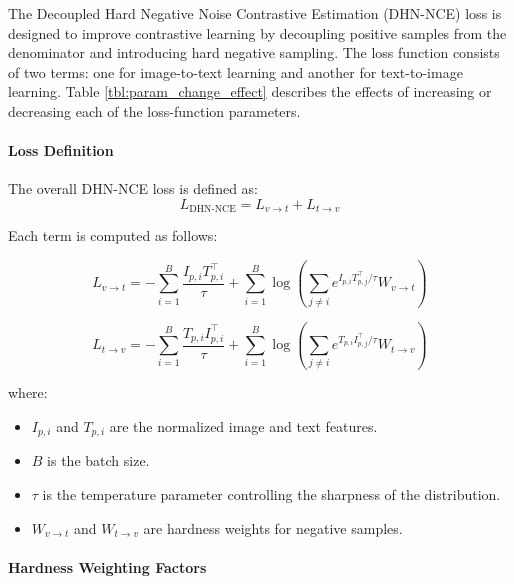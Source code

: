 \documentclass[./dissertation.tex]{subfiles}
\begin{document}
The Decoupled Hard Negative Noise Contrastive Estimation (DHN-NCE) loss is designed to improve contrastive learning by decoupling positive samples from the denominator and introducing hard negative sampling. The loss function consists of two terms: one for image-to-text learning and another for text-to-image learning. Table \ref{tbl:param_change_effect} describes the effects of increasing or decreasing each of the loss-function parameters.


\paragraph{Loss Definition\\}

The overall DHN-NCE loss is defined as:
\begin{equation}
    L_{\text{DHN-NCE}} = L_{v \to t} + L_{t \to v}
\end{equation}

Each term is computed as follows:

\begin{equation}
    L_{v \to t} = -\sum_{i=1}^{B} \frac{I_{p,i} T_{p,i}^\top}{\tau} + \sum_{i=1}^{B} \log \left( \sum_{j \neq i} e^{I_{p,i} T_{p,j}^\top / \tau} W_{v \to t} \right)
\end{equation}

\begin{equation}
    L_{t \to v} = -\sum_{i=1}^{B} \frac{T_{p,i} I_{p,i}^\top}{\tau} + \sum_{i=1}^{B} \log \left( \sum_{j \neq i} e^{T_{p,i} I_{p,j}^\top / \tau} W_{t \to v} \right)
\end{equation}

where:
\begin{itemize}
    \item \( I_{p,i} \) and \( T_{p,i} \) are the normalized image and text features.
    \item \( B \) is the batch size.
    \item \( \tau \) is the temperature parameter controlling the sharpness of the distribution.
    \item \( W_{v \to t} \) and \( W_{t \to v} \) are hardness weights for negative samples.
\end{itemize}

\paragraph{Hardness Weighting Factors\\}
\end{document}
